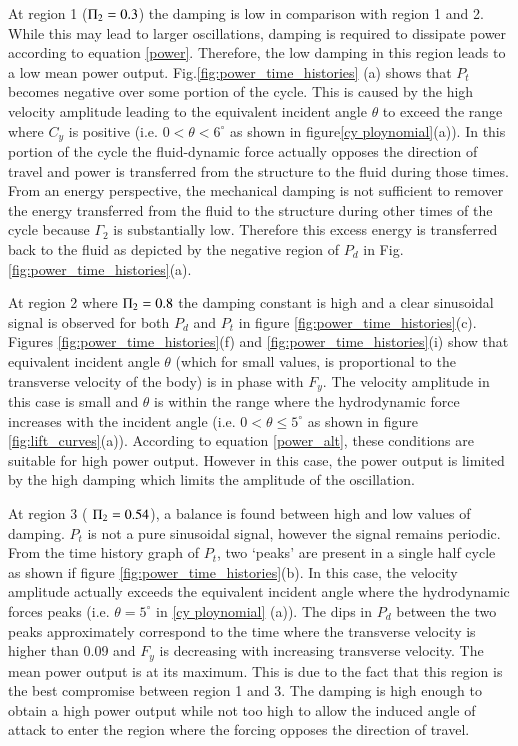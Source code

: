   
  
  
  At region 1 ($\Pi_2=0.3$) the damping is low in comparison with region 1 and 2. While this may lead to larger oscillations, damping is required to dissipate power according to equation \ref{power}. Therefore, the low damping in this region leads to a low mean power output. Fig.\ref{fig:power_time_histories} (a) shows that $P_t$ becomes negative over some portion of the cycle. This is caused by the high velocity amplitude leading to the equivalent incident angle $\theta$ to exceed the range where $C_y$ is positive (i.e. $0<\theta<6^\circ$ as shown in figure\ref{cy ploynomial}(a)). In this portion of the cycle the fluid-dynamic force actually opposes the direction of travel and power is transferred from the structure to the fluid during those times. From an energy perspective, the mechanical damping is not sufficient to remover the energy transferred from the fluid to the structure during other times of the cycle because $\Gamma_2$ is substantially low. Therefore this excess energy is transferred back to the fluid as depicted by the negative region of $P_d$ in Fig.\ref{fig:power_time_histories}(a).
 
 

 At region 2 where $\Pi_2=0.8$ the damping constant is high and a clear sinusoidal signal is observed for both $P_d$ and $P_t$ in figure \ref{fig:power_time_histories}(c). Figures \ref{fig:power_time_histories}(f) and  \ref{fig:power_time_histories}(i) show that equivalent incident angle $\theta$ (which for small values, is proportional to the transverse velocity of the body) is in phase with $F_y$.  The velocity amplitude in this case is small and $\theta$ is within the range where the hydrodynamic force increases with the incident angle (i.e. $0<\theta \leq 5^\circ$ as shown in figure \ref{fig:lift_curves}(a)). According to equation \ref{power_alt}, these conditions are suitable for high power output. However in this case, the power output is limited by the high damping which limits the amplitude of the oscillation.
  
 
  
 At region 3 ( $\Pi_2=0.54$), a balance is found between high and low values of damping. $P_t$ is not a pure sinusoidal signal, however the signal remains periodic. From the time history graph of $P_t$, two `peaks' are present in a single half cycle as shown if figure \ref{fig:power_time_histories}(b). In this case, the velocity amplitude actually exceeds the equivalent incident angle where the hydrodynamic forces peaks (i.e. $\theta=5^\circ$ in \ref{cy ploynomial} (a)). The dips in $P_d$ between the two peaks approximately correspond to the time where the transverse velocity is higher than 0.09 and $F_y$ is decreasing with increasing transverse velocity. The mean power output is at its maximum. This is due to the fact that this region is the best compromise between region 1 and 3. The damping is high enough to obtain a high power output while not too high to allow the induced angle of attack to enter the region where the forcing opposes the direction of travel. 
 
